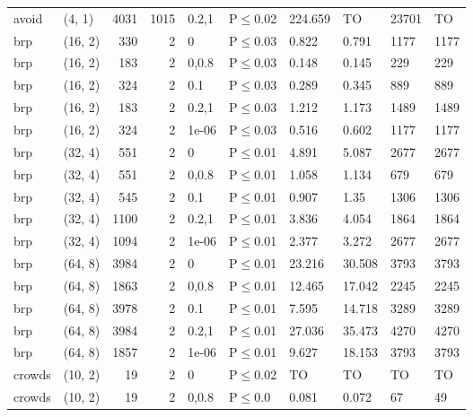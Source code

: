 \begin{longtable}{llrrllllll}
 avoid         & (4, 1)    &   	4031 & 1015 & 0.2,1 & P$\leq$0.02  & 224.659 & TO      & 23701   & TO   \\
 brp           & (16, 2)   &    	330 &    2 & 0     & P$\leq$0.03  & 0.822   & 0.791   & 1177    & 1177 \\
 brp           & (16, 2)   &    	183 &    2 & 0,0.8 & P$\leq$0.03  & 0.148   & 0.145   & 229     & 229  \\
 brp           & (16, 2)   &    	324 &    2 & 0.1   & P$\leq$0.03  & 0.289   & 0.345   & 889     & 889  \\
 brp           & (16, 2)   &    	183 &    2 & 0.2,1 & P$\leq$0.03  & 1.212   & 1.173   & 1489    & 1489 \\
 brp           & (16, 2)   &    	324 &    2 & 1e-06 & P$\leq$0.03  & 0.516   & 0.602   & 1177    & 1177 \\
 brp           & (32, 4)   &    	551 &    2 & 0     & P$\leq$0.01  & 4.891   & 5.087   & 2677    & 2677 \\
 brp           & (32, 4)   &    	551 &    2 & 0,0.8 & P$\leq$0.01  & 1.058   & 1.134   & 679     & 679  \\
 brp           & (32, 4)   &    	545 &    2 & 0.1   & P$\leq$0.01  & 0.907   & 1.35    & 1306    & 1306 \\
 brp           & (32, 4)   &   	1100 &    2 & 0.2,1 & P$\leq$0.01  & 3.836   & 4.054   & 1864    & 1864 \\
 brp           & (32, 4)   &   	1094 &    2 & 1e-06 & P$\leq$0.01  & 2.377   & 3.272   & 2677    & 2677 \\
 brp           & (64, 8)   &   	3984 &    2 & 0     & P$\leq$0.01  & 23.216  & 30.508  & 3793    & 3793 \\
 brp           & (64, 8)   &   	1863 &    2 & 0,0.8 & P$\leq$0.01  & 12.465  & 17.042  & 2245    & 2245 \\
 brp           & (64, 8)   &   	3978 &    2 & 0.1   & P$\leq$0.01  & 7.595   & 14.718  & 3289    & 3289 \\
 brp           & (64, 8)   &   	3984 &    2 & 0.2,1 & P$\leq$0.01  & 27.036  & 35.473  & 4270    & 4270 \\
 brp           & (64, 8)   &   	1857 &    2 & 1e-06 & P$\leq$0.01  & 9.627   & 18.153  & 3793    & 3793 \\
 crowds        & (10, 2)   &     	19 &    2 & 0     & P$\leq$0.02  & TO      & TO      & TO      & TO   \\
 crowds        & (10, 2)   &     	19 &    2 & 0,0.8 & P$\leq$0.0   & 0.081   & 0.072   & 67      & 49   \\

\end{longtable}

